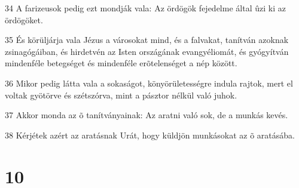 \par 34 A farizeusok pedig ezt mondják vala: Az ördögök fejedelme által ûzi ki az ördögöket.
\par 35 És körüljárja vala Jézus a városokat mind, és a falvakat, tanítván azoknak zsinagógáiban, és hirdetvén az Isten országának evangyéliomát, és gyógyítván mindenféle betegséget és mindenféle erõtelenséget a nép között.
\par 36 Mikor pedig látta vala a sokaságot, könyörületességre indula rajtok, mert el voltak gyötörve és szétszórva, mint a pásztor nélkül  való juhok.
\par 37 Akkor monda az õ tanítványainak: Az aratni való sok, de a munkás kevés.
\par 38 Kérjétek azért az aratásnak Urát, hogy küldjön munkásokat az õ aratásába.

\chapter{10}

